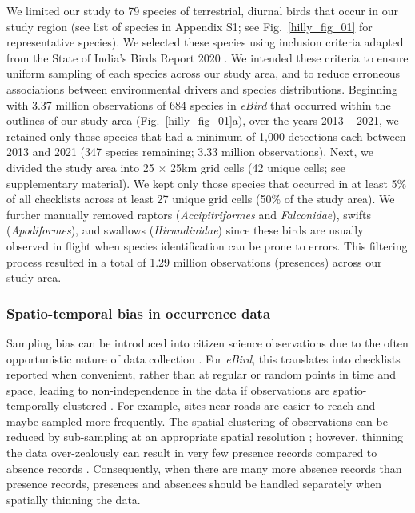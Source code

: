 We limited our study to 79 species of terrestrial, diurnal birds that occur in our study region (see list of species in {\color{red}Appendix S1}; see Fig.~\ref{hilly_fig_01} for representative species).
We selected these species using inclusion criteria adapted from the State of India's Birds Report 2020 \citep[SoIB][]{viswanathan2020}.
We intended these criteria to ensure uniform sampling of each species across our study area, and to reduce erroneous associations between environmental drivers and species distributions.
Beginning with 3.37 million observations of 684 species in \textit{eBird} that occurred within the outlines of our study area (Fig.~\ref{hilly_fig_01}a), over the years 2013 -- 2021, we retained only those species that had a minimum of 1,000 detections each between 2013 and 2021 (347 species remaining; 3.33 million observations).
Next, we divided the study area into 25 $\times$ 25km grid cells (42 unique cells; see supplementary material).
We kept only those species that occurred in at least 5\% of all checklists across at least 27 unique grid cells (50\% of the study area).
We further manually removed raptors (\textit{Accipitriformes} and \textit{Falconidae}), swifts (\textit{Apodiformes}), and swallows (\textit{Hirundinidae}) since these birds are usually observed in flight when species identification can be prone to errors.
This filtering process resulted in a total of 1.29 million observations (presences) across our study area.

\subsubsection*{Spatio-temporal bias in occurrence data}

Sampling bias can be introduced into citizen science observations due to the often opportunistic nature of data collection \citep{sullivan2014}.
For \textit{eBird}, this translates into checklists reported when convenient, rather than at regular or random points in time and space, leading to non-independence in the data if observations are spatio-temporally clustered \citep{johnston2021}.
For example, sites near roads are easier to reach and maybe sampled more frequently.
The spatial clustering of observations can be reduced by sub-sampling at an appropriate spatial resolution \citep{aiello-lammens2015}; however, thinning the data over-zealously can result in very few presence records compared to absence records \citep[i.e., class imbalance][]{steen2019}.
Consequently, when there are many more absence records than presence records, presences and absences should be handled separately when spatially thinning the data.

